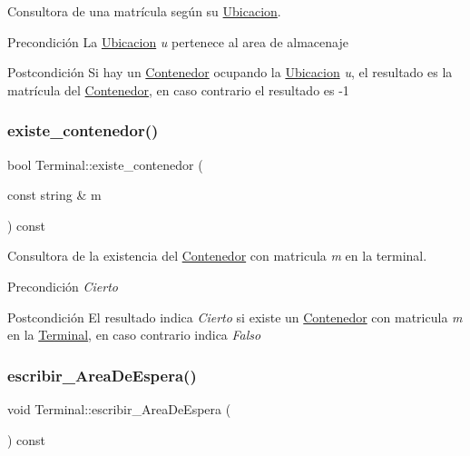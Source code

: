 Consultora de una matrícula según su \hyperlink{class_ubicacion}{Ubicacion}. 

\begin{DoxyPrecond}{Precondición}
La \hyperlink{class_ubicacion}{Ubicacion} {\itshape u} pertenece al area de almacenaje 
\end{DoxyPrecond}
\begin{DoxyPostcond}{Postcondición}
Si hay un \hyperlink{class_contenedor}{Contenedor} ocupando la \hyperlink{class_ubicacion}{Ubicacion} {\itshape u}, el resultado es la matrícula del \hyperlink{class_contenedor}{Contenedor}, en caso contrario el resultado es -\/1 
\end{DoxyPostcond}
\mbox{\label{class_terminal_a6b2cb1486f78ef82f759fb071bb1049d}} 
\subsubsection{\texorpdfstring{existe\+\_\+contenedor()}{existe\_contenedor()}}
{\footnotesize\ttfamily bool Terminal\+::existe\+\_\+contenedor (\begin{DoxyParamCaption}\item[{const string \&}]{m }\end{DoxyParamCaption}) const}



Consultora de la existencia del \hyperlink{class_contenedor}{Contenedor} con matricula {\itshape m} en la terminal. 

\begin{DoxyPrecond}{Precondición}
{\itshape Cierto} 
\end{DoxyPrecond}
\begin{DoxyPostcond}{Postcondición}
El resultado indica {\itshape Cierto} si existe un \hyperlink{class_contenedor}{Contenedor} con matricula {\itshape m} en la \hyperlink{class_terminal}{Terminal}, en caso contrario indica {\itshape Falso} 
\end{DoxyPostcond}
\mbox{\label{class_terminal_a3da2635443b21d89e5fecc47153a888f}} 
\subsubsection{\texorpdfstring{escribir\+\_\+\+Area\+De\+Espera()}{escribir\_AreaDeEspera()}}
{\footnotesize\ttfamily void Terminal\+::escribir\+\_\+\+Area\+De\+Espera (\begin{DoxyParamCaption}{ }\end{DoxyParamCaption}) const}



